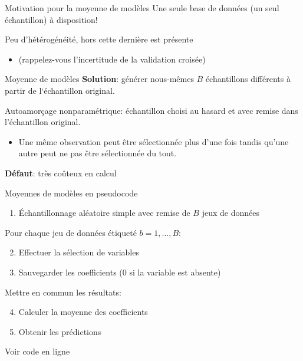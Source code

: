 \documentclass[
  ignorenonframetext,
]{beamer}
\providecommand{\tightlist}{%
  \setlength{\itemsep}{0pt}\setlength{\parskip}{0pt}}\usepackage{longtable,booktabs,array}
\begin{document}
\begin{frame}{Motivation pour la moyenne de modèles}
\protect\hypertarget{motivation-pour-la-moyenne-de-moduxe8les}{}
Une seule base de données (un seul échantillon) à disposition!

Peu d'hétérogénéité, hors cette dernière est présente

\begin{itemize}
\tightlist
\item
  (rappelez-vous l'incertitude de la validation croisée)
\end{itemize}
\end{frame}

\begin{frame}{Moyenne de modèles}
\protect\hypertarget{moyenne-de-moduxe8les}{}
\textbf{Solution}: générer nous-mêmes \(B\) échantillons différents à
partir de l`échantillon original.

Autoamorçage nonparamétrique: échantillon choisi au hasard et avec
remise dans l'échantillon original.

\begin{itemize}
\tightlist
\item
  Une même observation peut être sélectionnée plus d'une fois tandis
  qu'une autre peut ne pas être sélectionnée du tout.
\end{itemize}

\textbf{Défaut}: très coûteux en calcul
\end{frame}

\begin{frame}{Moyennes de modèles en pseudocode}
\protect\hypertarget{moyennes-de-moduxe8les-en-pseudocode}{}
\begin{enumerate}
\tightlist
\item
  Échantillonnage aléatoire simple avec remise de \(B\) jeux de données
\end{enumerate}

Pour chaque jeu de données étiqueté \(b=1, \ldots, B\):

\begin{enumerate}
\setcounter{enumi}{1}
\tightlist
\item
  Effectuer la sélection de variables
\item
  Sauvegarder les coefficients (0 si la variable est absente)
\end{enumerate}

Mettre en commun les résultats:

\begin{enumerate}
\setcounter{enumi}{3}
\tightlist
\item
  Calculer la moyenne des coefficients
\item
  Obtenir les prédictions
\end{enumerate}

\footnotesize

Voir code en ligne

\normalsize
\end{frame}
\end{document}
